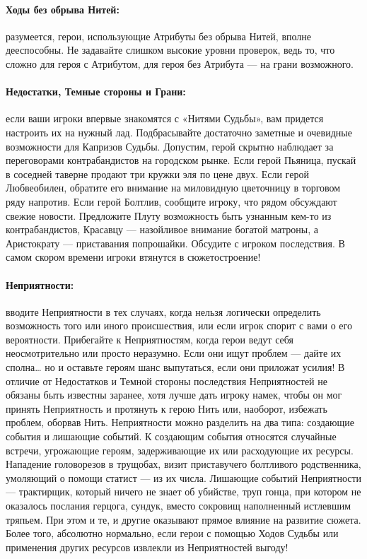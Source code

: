 \paragraph{Ходы без обрыва Нитей:} разумеется, герои, использующие Атрибуты без обрыва Нитей, вполне дееспособны. Не задавайте слишком высокие уровни проверок, ведь то, что сложно для героя с Атрибутом, для героя без Атрибута — на грани возможного.
\paragraph{Недостатки, Темные стороны и Грани:} если ваши игроки впервые знакомятся с «Нитями Судьбы», вам придется настроить их на нужный лад. Подбрасывайте достаточно заметные и очевидные возможности для Капризов Судьбы. Допустим, герой скрытно наблюдает за переговорами контрабандистов на городском рынке. Если герой Пьяница, пускай в соседней таверне продают три кружки эля по цене двух. Если герой Любвеобилен, обратите его внимание на миловидную цветочницу в торговом ряду напротив. Если герой Болтлив, сообщите игроку, что рядом обсуждают свежие новости. Предложите Плуту возможность быть узнанным кем-то из контрабандистов, Красавцу — назойливое внимание богатой матроны, а Аристократу — приставания попрошайки. Обсудите с игроком последствия. В самом скором времени игроки втянутся в сюжетостроение!
\paragraph{Неприятности:} вводите Неприятности в тех случаях, когда нельзя логически определить возможность того или иного происшествия, или если игрок спорит с вами о его вероятности. Прибегайте к Неприятностям, когда герои ведут себя неосмотрительно или просто неразумно. Если они ищут проблем — дайте их сполна… но и оставьте героям шанс выпутаться, если они приложат усилия! В отличие от Недостатков и Темной стороны последствия Неприятностей не обязаны быть известны заранее, хотя лучше дать игроку намек, чтобы он мог принять Неприятность и протянуть к герою Нить или, наоборот, избежать проблем, оборвав Нить.
\newline
Неприятности можно разделить на два типа: создающие события и лишающие событий. К создающим события относятся случайные встречи, угрожающие героям, задерживающие их или расходующие их ресурсы. Нападение головорезов в трущобах, визит приставучего болтливого родственника, умоляющий о помощи статист — из их числа. Лишающие событий Неприятности — трактирщик, который ничего не знает об убийстве, труп гонца, при котором не оказалось послания герцога, сундук, вместо сокровищ наполненный истлевшим тряпьем. При этом и те, и другие оказывают прямое влияние на развитие сюжета. Более того, абсолютно нормально, если герои с помощью Ходов Судьбы или применения других ресурсов извлекли из Неприятностей выгоду!
